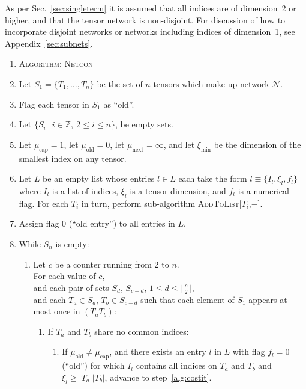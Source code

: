 \documentclass[aps,pre,reprint,superscriptaddress,amsfonts,amsmath,showpacs,nofootinbib,floatfix]{revtex4-1}
\newcommand{\mrm}[1]{\mathrm{#1}}
\newcommand{\mbb}[1]{\mathbb{#1}}
\newcommand{\mc}[1]{\mathcal{#1}}
\newcommand{\sref}[1]{Sec.~\ref{#1}}
\newcommand{\aref}[1]{Appendix~\ref{#1}}
\newcommand{\prtext}[1]{}
\newcommand{\arXtext}[1]{#1}
\newcommand{\fuse}[2]{(#1#2)} %
\begin{document}
As per \sref{sec:singleterm} it is assumed that all indices are of dimension~2 or higher, and that the tensor network is non-disjoint.\arXtext{ For discussion of how to incorporate disjoint networks or networks including indices of dimension~1, see \aref{sec:subnets}.}\prtext{ A discussion of how this algorithm may be extended to disjoint networks and networks including indices of dimension~1 may be found in the instructions accompanying the reference implementation \cite{EPAPS}.}

\begin{enumerate}
\item[] $\!\!\!\!\!\!\!$\textsc{Algorithm: Netcon}
\item \rule{0pt}{3.7ex}Let $S_1=\{T_1,\ldots,T_n\}$ be the set of $n$ tensors which make up network $\mc{N}$.
\item Flag each tensor in $S_1$ as ``old''.
\item Let $\{S_i~|~i\in\mbb{Z},~2\leq i\leq n\}$, be empty sets.
\item Let $\mu_\mrm{cap}=1$, let $\mu_\mrm{old}=0$, let $\mu_\mrm{next}=\infty$, and let $\xi_\mrm{min}$ be the dimension of the smallest index on any tensor.
\item Let $L$ be an empty list whose entries $l\in L$ each take the form $l\equiv\{I_l,\xi_l,f_l\}$ where $I_l$ is a list of indices, $\xi_l$ is a tensor dimension, and $f_l$ is a numerical flag. For each $T_i$ in turn, perform sub-algorithm \textsc{AddToList[$T_i$,$-$]}.
\item Assign flag 0 (``old entry'') to all entries in $L$.
\item While $S_n$ is empty:
\begin{enumerate}
\item Let $c$ be a counter running from 2 to $n$.\\For each value of $c$,\\and each pair of sets $S_d$, $S_{c-d}$, $1\leq d\leq \lfloor \frac{c}{2}\rfloor$,\\and each $T_a\in S_d$, $T_b\in S_{c-d}$ such that each element of $S_1$ appears at most once in $\fuse{T_a}{T_b}$:\label{alg:iterate}
\begin{enumerate}
\item If $T_a$ and $T_b$ share no common indices:
\begin{enumerate}
\item If $\mu_\mrm{old}\not=\mu_\mrm{cap}$, and there exists an entry $l$ in $L$ with flag $f_l=0$ (``old'') for which $I_l$ contains all indices on $T_a$ and $T_b$ and $\xi_l\geq |T_a||T_b|$, advance to step~\ref{alg:costit}.

\end{enumerate}
\end{enumerate}
\end{enumerate}
\end{enumerate}
\end{document}
